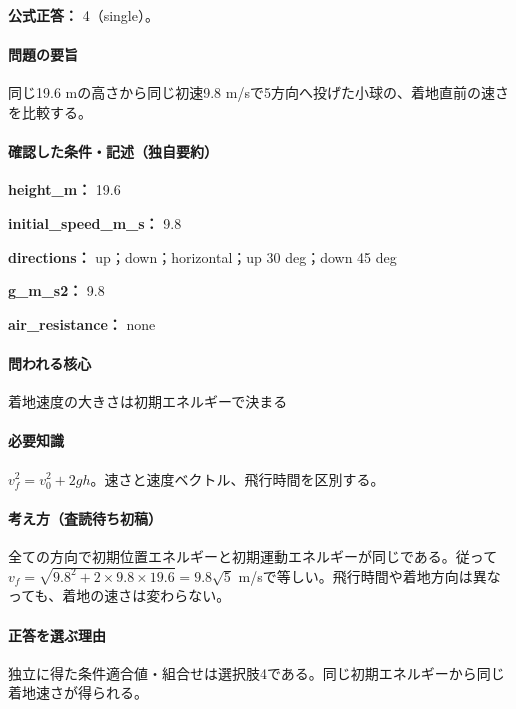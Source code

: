 \textbf{公式正答：} 4（single）。

\paragraph{問題の要旨} 同じ19.6 mの高さから同じ初速9.8 m/sで5方向へ投げた小球の、着地直前の速さを比較する。

\paragraph{確認した条件・記述（独自要約）}\mbox{}\par

\noindent\textbf{height\_m：} 19.6\par

\noindent\textbf{initial\_speed\_m\_s：} 9.8\par

\noindent\textbf{directions：} up；down；horizontal；up 30 deg；down 45 deg\par

\noindent\textbf{g\_m\_s2：} 9.8\par

\noindent\textbf{air\_resistance：} none\par

\paragraph{問われる核心} 着地速度の大きさは初期エネルギーで決まる

\paragraph{必要知識} \(v_f^2=v_0^2+2gh\)。速さと速度ベクトル、飛行時間を区別する。

\paragraph{考え方（査読待ち初稿）} 全ての方向で初期位置エネルギーと初期運動エネルギーが同じである。従って\(v_f=\sqrt{9.8^2+2\times9.8\times19.6}=9.8\sqrt5\) m/sで等しい。飛行時間や着地方向は異なっても、着地の速さは変わらない。

\paragraph{正答を選ぶ理由} 独立に得た条件適合値・組合せは選択肢4である。同じ初期エネルギーから同じ着地速さが得られる。

